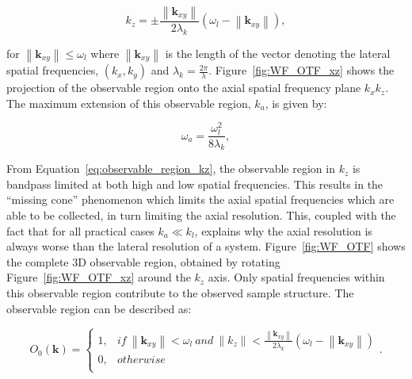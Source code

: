 \begin{equation}\label{eq:observable_region_kz}
k_{z} = \pm\frac{\left\|\textbf{k}_{xy}\right\|}{2\lambda_{k}}(\omega_{l} - \left\|\textbf{k}_{xy}\right\|),
\end{equation}

for $\left\|\textbf{k}_{xy}\right\| \le \omega_{l}$ where 
$\left\|\textbf{k}_{xy}\right\|$ is the length of the vector denoting the 
lateral spatial frequencies, $(k_{x},k_{y})$ and $\lambda_{k} = 
\frac{2\pi}{\lambda}$\cite{frieden1967optical}. Figure~\ref{fig:WF_OTF_xz} shows 
the projection of the observable region onto the axial spatial frequency plane 
$k_{x}k_{z}$. The maximum extension of this observable region, $k_{a}$, is given 
by:

\begin{equation}\label{eq:axial_observable_max_k}
\omega_{a} = \frac{\omega_{l}^{2}}{8\lambda_{k}},
\end{equation}

From Equation~\ref{eq:observable_region_kz}, the observable
region in $k_{z}$ is bandpass limited at both high and low spatial frequencies.
This results in the ``missing cone'' phenomenon which limits the axial spatial 
frequencies which are able to be collected, in turn limiting the axial 
resolution\cite{behan2009three,arnison20023d}. This, coupled with the fact that
for all practical cases $k_{a} \ll k_{l}$, explains why the axial resolution is
always worse than the lateral resolution of a system. Figure~\ref{fig:WF_OTF} 
shows the complete 3D observable region, obtained by rotating 
Figure~\ref{fig:WF_OTF_xz} around the $k_{z}$ axis. Only spatial frequencies
within this observable region contribute to the observed sample structure.
The observable region can be described as:

\begin{equation}\label{eq:observable region}
O_{0}(\textbf{k}) = 
\begin{cases}
1, & if~ \left\|\textbf{k}_{xy}\right\| < \omega_{l} ~and~ \left\|k_{z}\right\| < \frac{\left\|\textbf{k}_{xy}\right\|}{2\lambda_{k}}(\omega_{l} - \left\|\textbf{k}_{xy}\right\|)\\
0, & otherwise\\
\end{cases}.
\end{equation}

